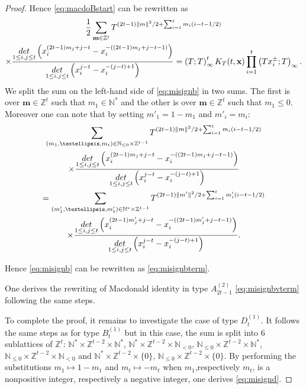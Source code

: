 \documentclass[10pt,a4paper]{amsart}
\def\bbbn{\mathbb N}
\def\bbbz{\mathbb Z}
\def\det{{\rm det}}
\begin{document}
\begin{proof}
Hence \eqref{eq:macdoBstart} can be rewritten as
\begin{multline}
\frac{1}{2}\sum_{\mathbf{m}\in\bbbz^t}T^{(2t-1)\lVert m\rVert^2/2+\sum_{i=1}^tm_i(i-t-1/2)}\\
\times\frac{\underset{1\le i,j\le t}{\det}\left(x_i^{(2t-1)m_j+j-t}-x_i^{-((2t-1)m_j+j-t-1)}\right)}{\underset{1\le i,j\le t}{\det}\left(x_i^{j-t}-x_i^{-(j-t)+1}\right)}
=\left(T;T\right)_\infty^{t} K_T(t,\mathbf{x})\prod_{i=1}^t \left(Tx_i^{\pm};T\right)_\infty .\label{eq:misignb}
\end{multline}
We split the sum on the left-hand side of \eqref{eq:misignb} in two sums. The first is over $\mathbf{m}\in\bbbz^t$ such that $m_1\in\bbbn^*$ and the other is over $\mathbf{m}\in\bbbz^t$ such that $m_1\leq 0$. Moreover one can note that by setting $m'_1=1-m_1$ and $m'_i=m_i$:
\begin{multline*}
\sum_{(m_1,\dots,m_t)\in\mathbb{N}_{\leq 0}\times\bbbz^{t-1}}T^{(2t-1)\lVert m\rVert^2/2+\sum_{i=1}^tm_i(i-t-1/2)}\\\times\frac{\underset{1\le i,j\le t}{\det}\left(x_i^{(2t-1)m_j+j-t}-x_i^{-((2t-1)m_j+j-t-1)}\right)}{\underset{1\le i,j\le t}{\det}\left(x_i^{j-t}-x_i^{-(j-t)+1}\right)}
\\=\sum_{(m'_1,\dots,m'_t)\in\mathbb{N}^*\times\bbbz^{t-1}}T^{(2t-1)\lVert m'\rVert^2/2+\sum_{i=1}^tm'_i(i-t-1/2)}
\\\times \frac{\underset{1\le i,j\le t}{\det}\left(x_i^{(2t-1)m'_j+j-t}-x_i^{-((2t-1)m'_j+j-t-1)}\right)}{\underset{1\le i,j\le t}{\det}\left(x_i^{j-t}-x_i^{-(j-t)+1}\right)}.
\end{multline*}
%

\noindent Hence \eqref{eq:misignb} can be rewritten as \eqref{eq:misignbterm}.

\noindent One derives the rewriting of Macdonald identity in type $A_{2t-1}^{(2)}$ \eqref{eq:misignbvterm} following the same steps.

\noindent To complete the proof, it remains to investigate the case of type $D_t^{(1)}$. It follows the same steps as for type $B_t^{(1)}$ but in this case, the sum is split into $6$ sublattices of $\mathbb{Z}^t$: $\bbbn^*\times \bbbz^{t-2}\times \bbbn^*$, $\bbbn^*\times \bbbz^{t-2}\times \bbbn_{<0}$, $\bbbn_{\leq 0}\times \bbbz^{t-2}\times \bbbn^*$, $\bbbn_{\leq 0}\times \bbbz^{t-2}\times \bbbn_{<0}$ and 
$\bbbn^*\times \bbbz^{t-2}\times \lbrace 0 \rbrace$, $\bbbn_{\leq 0}\times \bbbz^{t-2}\times \lbrace 0 \rbrace$.
By performing the substitutions $m_1\mapsto 1-m_1$ and $m_t\mapsto -m_t$ when $m_1$,respectively $m_t$, is a nonpositive integer, respectively a negative integer, one derives \eqref{eq:misignd}.
\end{proof}
\end{document}
